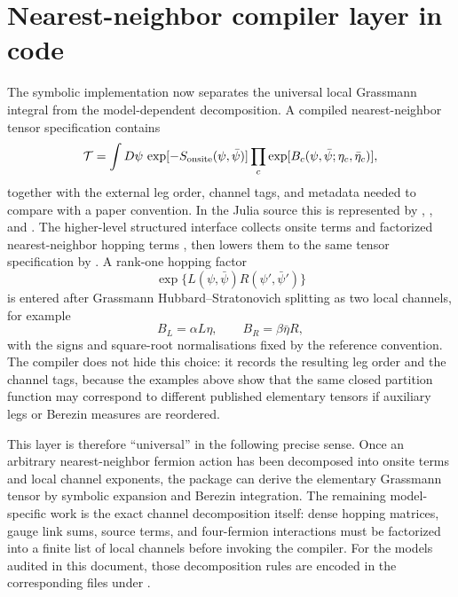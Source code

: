 \documentclass[UTF8,11pt]{ctexart}
\begin{document}
\section{Nearest-neighbor compiler layer in code}
The symbolic implementation now separates the universal local Grassmann
integral from the model-dependent decomposition.  A compiled nearest-neighbor
tensor specification contains
\begin{equation}
 \mathcal T = \int D\psi\,\exp[-S_{\rm onsite}(\psi,\bar\psi)]
 \prod_c \exp[B_c(\psi,\bar\psi;\eta_c,\bar\eta_c)],
\end{equation}
together with the external leg order, channel tags, and metadata needed to
compare with a paper convention.  In the Julia source this is represented by
, , and
.  The higher-level structured interface
 collects onsite terms  and
factorized nearest-neighbor hopping terms , then
lowers them to the same tensor specification by .
A rank-one hopping factor
\begin{equation}
 \exp\{L(\psi,\bar\psi)R(\psi',\bar\psi')\}
\end{equation}
is entered after Grassmann Hubbard--Stratonovich splitting as two local
channels, for example
\begin{equation}
 B_L = \alpha L\eta,\qquad B_R=\beta\bar\eta R,
\end{equation}
with the signs and square-root normalisations fixed by the reference
convention.  The compiler does not hide this choice: it records the resulting
leg order and the channel tags, because the examples above show that the same
closed partition function may correspond to different published elementary
tensors if auxiliary legs or Berezin measures are reordered.

This layer is therefore ``universal'' in the following precise sense.  Once an
arbitrary nearest-neighbor fermion action has been decomposed into onsite terms
and local channel exponents, the package can derive the elementary Grassmann
tensor by symbolic expansion and Berezin integration.  The remaining
model-specific work is the exact channel decomposition itself: dense hopping
matrices, gauge link sums, source terms, and four-fermion interactions must be
factorized into a finite list of local channels before invoking the compiler.
For the models audited in this document, those decomposition rules are encoded
in the corresponding files under .
\end{document}
